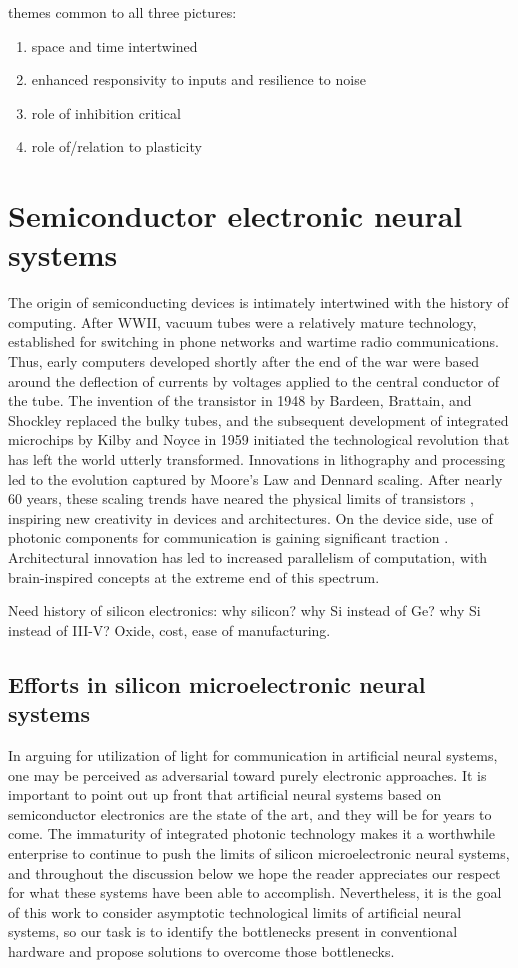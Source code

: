 \documentclass[twocolumn]{article}
\begin{document}
\vspace{3em}
themes common to all three pictures:
\begin{enumerate}
\item space and time intertwined
\item enhanced responsivity to inputs and resilience to noise
\item role of inhibition critical
\item role of/relation to plasticity
\end{enumerate}



\section{\label{sec:electronics}Semiconductor electronic neural systems}
The origin of semiconducting devices is intimately intertwined with the history of computing. After WWII, vacuum tubes were a relatively mature technology, established for switching in phone networks and wartime radio communications. Thus, early computers developed shortly after the end of the war were based around the deflection of currents by voltages applied to the central conductor of the tube. The invention of the transistor in 1948 by Bardeen, Brattain, and Shockley replaced the bulky tubes, and the subsequent development of integrated microchips by Kilby and Noyce in 1959 initiated the technological revolution that has left the world utterly transformed. Innovations in lithography and processing led to the evolution captured by Moore's Law and Dennard scaling. After nearly 60 years, these scaling trends have neared the physical limits of transistors \cite{}, inspiring new creativity in devices and architectures. On the device side, use of photonic components for communication is gaining significant traction \cite{suwa2015,stra2018}. Architectural innovation has led to increased parallelism of computation, with brain-inspired concepts at the extreme end of this spectrum.

Need history of silicon electronics: why silicon? why Si instead of Ge? why Si instead of III-V? Oxide, cost, ease of manufacturing.

\subsection{Efforts in silicon microelectronic neural systems}
In arguing for utilization of light for communication in artificial neural systems, one may be perceived as adversarial toward purely electronic approaches. It is important to point out up front that artificial neural systems based on semiconductor electronics are the state of the art, and they will be for years to come. The immaturity of integrated photonic technology makes it a worthwhile enterprise to continue to push the limits of silicon microelectronic neural systems, and throughout the discussion below we hope the reader appreciates our respect for what these systems have been able to accomplish. Nevertheless, it is the goal of this work to consider asymptotic technological limits of artificial neural systems, so our task is to identify the bottlenecks present in conventional hardware and propose solutions to overcome those bottlenecks.
\end{document}
